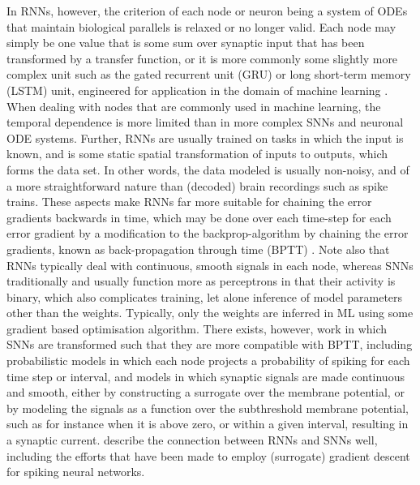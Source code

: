 \documentclass[mphil,deptreport,ianc]{infthesis} %
\begin{document}
In RNNs, however, the criterion of each node or neuron being a system of ODEs that maintain biological parallels is relaxed or no longer valid. 
Each node may simply be one value that is some sum over synaptic input that has been transformed by a transfer function, or it is more commonly some slightly more complex unit such as the gated recurrent unit (GRU) \cite{Bengio2013b, Chung2015a} or long short-term memory (LSTM) unit, engineered for application in the domain of machine learning \cite{Hochreiter1997, Schmidhuber2014}.
When dealing with nodes that are commonly used in machine learning, the temporal dependence is more limited than in more complex SNNs and neuronal ODE systems.
Further, RNNs are usually trained on tasks in which the input is known, and is some static spatial transformation of inputs to outputs, which forms the data set.
In other words, the data modeled is usually non-noisy, and of a more straightforward nature than (decoded) brain recordings such as spike trains.
These aspects make RNNs far more suitable for chaining the error gradients backwards in time, which may be done over each time-step for each error gradient by a modification to the backprop-algorithm by chaining the error gradients, known as back-propagation through time (BPTT) \cite{Rumelhart1986}.
Note also that RNNs typically deal with continuous, smooth signals in each node, whereas SNNs traditionally and usually function more as perceptrons in that their activity is binary, which also complicates training, let alone inference of model parameters other than the weights.
Typically, only the weights are inferred in ML using some gradient based optimisation algorithm.
There exists, however, work in which SNNs are transformed such that they are more compatible with BPTT, including probabilistic models in which each node projects a probability of spiking for each time step or interval, and models in which synaptic signals are made continuous and smooth, either by constructing a surrogate over the membrane potential, or by modeling the signals as a function over the subthreshold membrane potential, such as for instance when it is above zero, or within a given interval, resulting in a synaptic current.
\cite{Neftci2019} describe the connection between RNNs and SNNs well, including the efforts that have been made to employ (surrogate) gradient descent for spiking neural networks.
\end{document}
